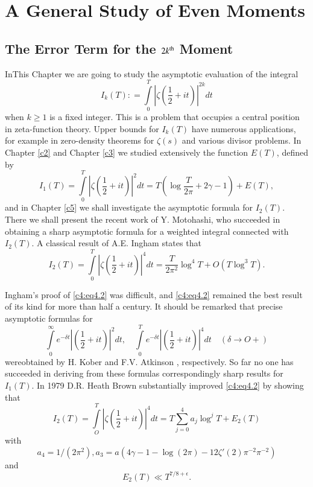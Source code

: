 \chapter{A General Study of Even Moments}\label{c4}

\section{The Error Term for the $2k^{\rm th}$ Moment}\label{c4:sec4.1}

In\pageoriginale This Chapter we are going to study the asymptotic evaluation of the
integral
\begin{equation}
  I_k(T) : = \int\limits_0^T \left|\zeta \left(\frac{1}{2} +
  it\right)\right|^{2k} dt\label{c4:eq4.1} 
\end{equation}
when $k \geq 1$ is a fixed integer. This is a problem that occupies a
central position in zeta-function theory. Upper bounds for $I_k (T)$
have numerous applications, for example in zero-density theorems for
$\zeta (s)$ and various divisor problems. In Chapter \ref{c2} and
Chapter \ref{c3} 
we studied extensively the function $E(T)$, defined by
$$
I_1 (T) = \int\limits_0^T \left|\zeta \left(\frac{1}{2} + it \right)
\right|^2 dt= T\left(\log \frac{T}{2 \pi} + 2 \gamma -1 \right) + E(T),
$$
and in Chapter \ref{c5} we shall investigate the asymptotic formula for $I_2
(T)$. There we shall present the recent work of Y. Motohashi, who
succeeded in obtaining a sharp asymptotic formula for a weighted
integral connected with $I_2 (T)$. A classical result of A.E. Ingham
states that
\begin{equation}
  I_2 (T) = \int\limits_0^T \left|\zeta \left(\frac{1}{2} + it
  \right)\right|^4 
  dt = \frac{T}{2\pi^2} \log^4 T + O(T \log ^3 T). \label{c4:eq4.2}
\end{equation}

Ingham's proof of \eqref{c4:eq4.2} was difficult, and \eqref{c4:eq4.2}
remained the best result of its kind for more than half a century. It
should be remarked that precise asymptotic formulas for 
$$
\int\limits_0^\infty e^{- \delta t} \left|\left(\frac{1}{2} + it
\right) \right|^2 dt,\quad \int\limits_0^T e^{- \delta t}
\left|\left(\frac{1}{2} + it \right) \right|^4 dt \quad (\delta \to O+)
$$
were\pageoriginale obtained by H. Kober \cite{Kober1} and F.V. Atkinson
\cite{Atkinson1}, respectively. So far no one has succeeded in deriving from
these formulas correspondingly sharp results for $I_1(T)$. In 1979
D.R. Heath Brown \cite{Heath-Brown3} substantially improved \eqref{c4:eq4.2} by
showing that
\begin{equation}
  I_2 (T)  = \int\limits_O^T \left|\zeta \left(\frac{1}{2} + it
  \right)\right|^4 dt =T \sum_{j=0}^4 a _j \log^j T + E_2 (T)\label{c4:eq4.3}
\end{equation}
with
\begin{equation}
  a_4 = 1/(2 \pi^2), a_3  = a\left(4 \gamma -1-\log(2 \pi)- 12 \zeta' (2)
  \pi^{-2} \pi^{-2}\right)\label{c4:eq4.4}
\end{equation}
and
\begin{equation}
  E_2(T)  \ll T^{7/8+\epsilon}.\label{c4:eq4.5}
\end{equation}

